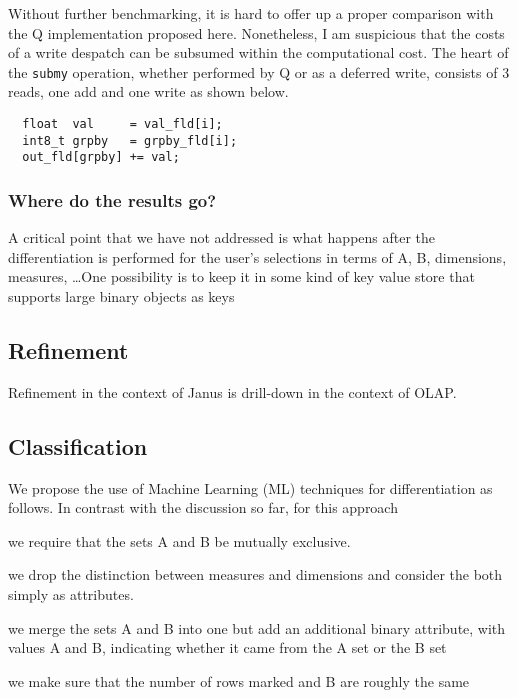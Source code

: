 Without further benchmarking, it is hard to offer up a proper comparison with
the Q implementation proposed here. Nonetheless, I am suspicious that the costs
of a write despatch can be subsumed within the computational cost. The heart of
the {\tt submy} operation, whether performed by Q or as a deferred write,
consists of 3 reads, one add and one write as shown below.
\begin{verbatim}
  float  val     = val_fld[i];
  int8_t grpby   = grpby_fld[i];
  out_fld[grpby] += val;
\end{verbatim}

\subsubsection{Where do the results go?}

A critical point that we have not addressed is what happens after the
differentiation is performed for the user's selections in terms of A, B,
dimensions, measures, \ldots One possibility is to keep it in some kind of key
value store that supports large binary objects as keys

\TBC

\subsection{Refinement}
\label{Refinement}

Refinement in the context of Janus is drill-down in the context of OLAP. 


\TBC

\subsection{Classification}
\label{Classification}

We propose the use of Machine Learning (ML) techniques for differentiation as
follows. 
In contrast with the discussion so far, for this approach
\be
\item we require that the sets A and B be mutually exclusive.
\item we drop the distinction between measures and dimensions and
consider the both simply as attributes.
\item we merge the sets A and B into one but add an additional 
binary attribute, with values A and B, indicating whether it came from the A set
or the B set
\item we make sure that the number of rows marked and B are roughly the same
\ee

